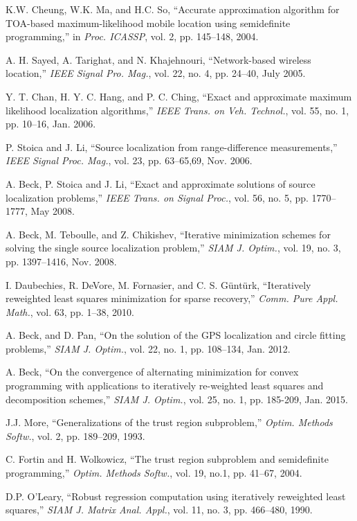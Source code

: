 \begin{thebibliography}{99}
K.W. Cheung, W.K. Ma, and H.C. So, ``Accurate approximation algorithm for TOA-based maximum-likelihood mobile location using semidefinite programming,'' in {\em Proc. ICASSP}, vol. 2, pp. 145--148, 2004.

A. H. Sayed, A. Tarighat, and N. Khajehnouri, ``Network-based wireless location,'' {\em IEEE Signal Pro. Mag.}, vol. 22, no. 4, pp. 24--40, July 2005.

 Y. T. Chan, H. Y. C. Hang, and P. C. Ching, ``Exact and approximate maximum likelihood localization algorithms,'' {\em IEEE Trans. on Veh. Technol.}, vol. 55, no. 1, pp. 10--16, Jan. 2006.

P. Stoica and J. Li, ``Source localization from range-difference measurements,'' {\em IEEE Signal Proc. Mag.}, vol. 23, pp. 63--65,69, Nov. 2006.

A. Beck, P. Stoica and J. Li,  ``Exact and approximate solutions of source localization problems,'' {\em IEEE Trans. on Signal Proc.}, vol. 56, no. 5, pp. 1770--1777, May 2008.

A. Beck, M. Teboulle, and Z. Chikishev, ``Iterative minimization schemes for solving the single source localization problem,''  {\em SIAM J. Optim.}, vol. 19, no. 3, pp. 1397--1416, Nov. 2008.

I. Daubechies, R. DeVore, M. Fornasier, and C. S. G\"unt\"urk, ``Iteratively reweighted least squares minimization for sparse recovery,'' {\em Comm. Pure Appl. Math.}, vol. 63, pp. 1--38, 2010.

A. Beck, and D. Pan, ``On the solution of the GPS localization and circle fitting problems,''  {\em SIAM J. Optim.}, vol. 22, no. 1, pp. 108--134, Jan. 2012.

A. Beck, ``On the convergence of alternating minimization for convex programming with applications to iteratively re-weighted least squares and decomposition schemes,''  {\em SIAM J. Optim.}, vol. 25, no. 1, pp. 185-209, Jan. 2015.

J.J. More, ``Generalizations of the trust region subproblem,'' {\em Optim. Methods Softw.}, vol. 2, pp. 189--209, 1993.

C. Fortin and H. Wolkowicz, ``The trust region subproblem and semidefinite programming,'' {\em Optim. Methods Softw.}, vol. 19, no.1, pp. 41--67, 2004.

D.P. O'Leary, ``Robust regression computation using iteratively reweighted least squares,'' {\em SIAM J. Matrix Anal. Appl.}, vol. 11, no. 3, pp. 466--480, 1990.


\end{thebibliography}
